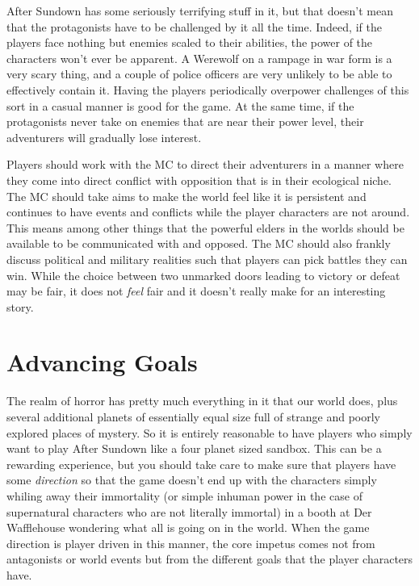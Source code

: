 After Sundown has some seriously terrifying stuff in it, but that doesn't mean that the protagonists have to be challenged by it all the time. Indeed, if the players face nothing but enemies scaled to their abilities, the power of the characters won't ever be apparent. A Werewolf on a rampage in war form is a very scary thing, and a couple of police officers are very unlikely to be able to effectively contain it. Having the players periodically overpower challenges of this sort in a casual manner is good for the game. At the same time, if the protagonists never take on enemies that are near their power level, their adventurers will gradually lose interest.

Players should work with the MC to direct their adventurers in a manner where they come into direct conflict with opposition that is in their ecological niche. The MC should take aims to make the world feel like it is persistent and continues to have events and conflicts while the player characters are not around. This means among other things that the powerful elders in the worlds should be available to be communicated with and opposed. The MC should also frankly discuss political and military realities such that players can pick battles they can win. While the choice between two unmarked doors leading to victory or defeat may be fair, it does not \textit{feel} fair and it doesn't really make for an interesting story.

\section{Advancing Goals}

The realm of horror has pretty much everything in it that our world does, plus several additional planets of essentially equal size full of strange and poorly explored places of mystery. So it is entirely reasonable to have players who simply want to play After Sundown like a four planet sized sandbox. This can be a rewarding experience, but you should take care to make sure that players have some \textit{direction} so that the game doesn't end up with the characters simply whiling away their immortality (or simple inhuman power in the case of supernatural characters who are not literally immortal) in a booth at Der Wafflehouse wondering what all is going on in the world. When the game direction is player driven in this manner, the core impetus comes not from antagonists or world events but from the different goals that the player characters have.

